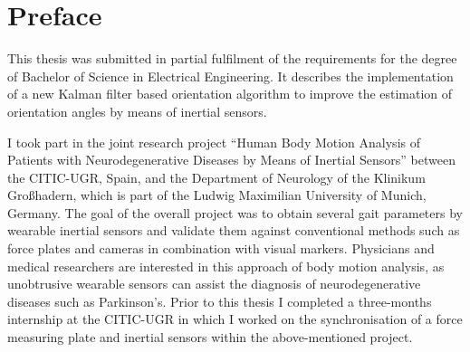 \chapter*{Preface}

This thesis was submitted in partial fulfilment of the requirements for the degree of Bachelor of Science in Electrical Engineering. It describes the implementation of a new Kalman filter based orientation algorithm to improve the estimation of orientation angles by means of inertial sensors.

I took part in the joint research project “Human Body Motion Analysis of Patients with Neurodegenerative Diseases by Means of Inertial Sensors” between the \gls{CITIC-UGR}, Spain, and the Department of Neurology of the Klinikum Großhadern, which is part of the Ludwig Maximilian University of Munich, Germany. The goal of the overall project was to obtain several gait parameters by wearable inertial sensors and validate them against conventional methods such as force plates and cameras in combination with visual markers. Physicians and medical researchers are interested in this approach of body motion analysis, as unobtrusive wearable sensors can assist the diagnosis of neurodegenerative diseases such as Parkinson's. Prior to this thesis I completed a three-months internship at the \gls{CITIC-UGR} in which I worked on the synchronisation of a force measuring plate and inertial sensors within the above-mentioned project.